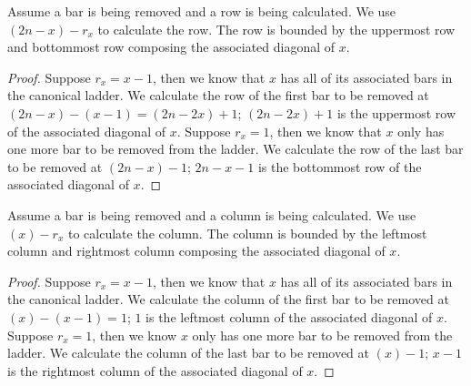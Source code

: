 \begin{lemma}
  Assume a bar is being removed and a row is being calculated. 
  We use $(2n - x)-r_{x}$ to calculate the row. The row is bounded by the uppermost row and bottommost row composing the 
  associated diagonal of $x$.
  \label{Lemma:Case3} 
  
\end{lemma}
\begin{proof}
  Suppose $r_{x}=x-1$, then we know that $x$ has all of its associated bars in the canonical ladder. We calculate the row of the first bar to 
  be removed at $(2n-x)-(x-1)=(2n - 2x)+1$; $(2n - 2x)+1$ is the uppermost row of the associated diagonal of $x$. Suppose $r_{x}=1$, then we know that 
  $x$ only has one more bar to be removed from the ladder. We calculate the row of the last bar to be removed at $(2n-x)-1$; $2n-x-1$ is the bottommost 
  row of the associated diagonal of $x$. 

\end{proof}
\begin{lemma}
  Assume a bar is being removed and a column is being calculated. We use $(x)-r_{x}$ to calculate the column. 
  The column is bounded by the leftmost column and rightmost column composing the associated diagonal of $x$.
  \label{Lemma:Case4}
\end{lemma}
\begin{proof}
  Suppose $r_{x}=x-1$, then we know that $x$ has all of its associated bars in the canonical ladder. We calculate the column 
  of the first bar to be removed at $(x)-(x-1)=1$; $1$ is the leftmost column of the associated diagonal of $x$. Suppose 
  $r_{x}=1$, then we know $x$ only has one more bar to be removed from the ladder. We calculate the column of the last bar to be 
  removed at $(x)-1$; $x-1$ is the rightmost column of the associated diagonal of $x$.
\end{proof}

